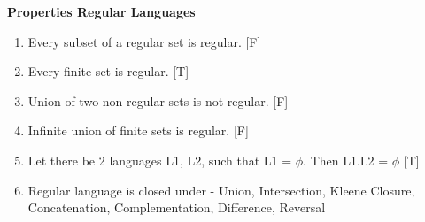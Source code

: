 
\centerline{\textbf{ \LARGE  Properties Regular Languages }}

\begin{enumerate}
    \item Every subset of a regular set is regular. [F]
    \item Every finite set is regular. [T]
    \item Union of two non regular sets is not regular. [F]
    \item Infinite union of finite sets is regular. [F]
    \item Let there be 2 languages L1, L2, such that L1 = {\large \( \phi \)}. Then L1.L2 = {\large \(\phi\) } [T]
    \item Regular language is closed under - Union, Intersection, Kleene Closure, Concatenation, Complementation, Difference, Reversal

\end{enumerate}



\begin{comment}

    \( \mathbf {  } \)  \text{a}^\text{b}  \text{a}^*

    (00)^*   \lambda   \phi

\end{comment}
